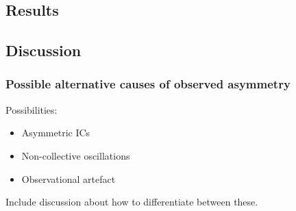 \documentclass[12pt]{../style-files/ociamthesis}
\begin{document}
\subsection{Results}


\subsection{Discussion}

\subsubsection{Possible alternative causes of observed asymmetry}
Possibilities: 
\begin{itemize}
	\item Asymmetric ICs
	\item Non-collective oscillations
	\item Observational artefact
\end{itemize}
Include discussion about how to differentiate between these.





  
\end{document}
